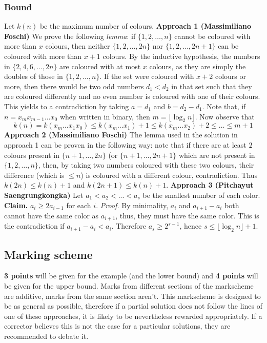 \subsubsection{Bound}
Let $k(n)$ be the maximum number of colours.\nl
\textbf{Approach 1 (Massimiliano Foschi)}\nl
We prove the following \emph{lemma}: if $\{1, 2, \ldots, n\}$ cannot be coloured with more than $x$ colours, then neither $\{1, 2, \ldots, 2n\}$ nor $\{1, 2, \ldots, 2n+1\}$ can be coloured with more than $x+1$ colours.
\nl
By the inductive hypothesis, the numbers in $\{2, 4, 6, \ldots, 2n\}$ are coloured with at most $x$ colours, as they are simply the doubles of those in $\{1, 2, \ldots, n\}$. If the set were coloured with $x+2$ colours or more, then there would be two odd numbers $d_1<d_2$ in that set such that they are coloured differently and no even number is coloured with one of their colours. This yields to a contradiction by taking $a=d_1$ and $b=d_2-d_1$.
\nl
Note that, if $n=x_mx_{m-1}\ldots x_0$ when written in binary, then $m=\lfloor \log_2 n \rfloor$. Now observe that $$k(n)=k(x_m\ldots x_1x_0) \leq k(x_m\ldots x_1)+1 \leq k(x_m \ldots x_2)+2 \leq \ldots \leq m+1$$
\nl
\textbf{Approach 2 (Massimiliano Foschi)}
\nl
The lemma used in the solution in approach 1 can be proven in the following way:
\nl
note that if there are at least $2$ colours present in $\{n+1, \ldots, 2n\}$ (or $\{n+1, \ldots, 2n+1\}$ which are not present in $\{1, 2, \ldots, n\}$, then, by taking two numbers coloured with these two colours, their difference (which is $\leq n$) is coloured with a different colour, contradiction.
\nl
Thus $k(2n) \leq k(n)+1$ and $k(2n+1) \leq k(n)+1$.
\nl
\textbf{Approach 3 (Pitchayut Saengrungkongka)}
\nl
Let $a_1<a_2<...<a_s$ be the smallest number of each color.
\nl
\textbf{Claim.} $a_i \geq 2a_{i-1}$ for each $i$.
\nl
\textit{Proof.} By minimality, $a_i$ and $a_{i+1}-a_i$ both cannot have the same color as $a_{i+1}$, thus, they must have the same color. This is the contradiction if $a_{i+1}-a_i<a_i$.
\nl
Therefore $a_s \geq 2^{s-1}$, hence $s \leq \lfloor \log_2 n \rfloor +1$.
\subsection{Marking scheme}
\textbf{3 points} will be given for the example (and the lower bound) and \textbf{4 points} will be given for the upper bound. Marks from different sections of the markscheme are additive, marks from the same section aren't. This markscheme is designed to be as general as possible, therefore if a partial solution does not follow the lines of one of these approaches, it is likely to be nevertheless rewarded appropriately.
\nl
If a corrector believes this is not the case for a particular solutions, they are recommended to debate it.
